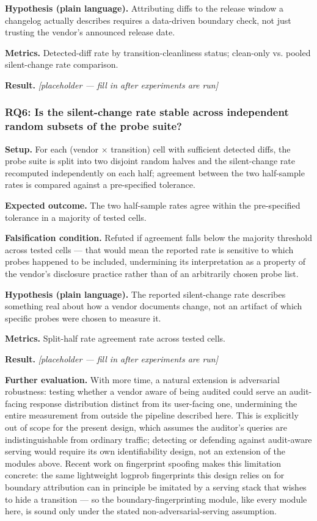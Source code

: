 \documentclass[11pt]{article}
\newcommand{\ph}{\textit{[placeholder --- fill in after experiments are run]}}
\begin{document}
\textbf{Hypothesis (plain language).} Attributing diffs to the release window a changelog actually describes requires a data-driven boundary check, not just trusting the vendor's announced release date.

\textbf{Metrics.} Detected-diff rate by transition-cleanliness status; clean-only vs. pooled silent-change rate comparison.

\textbf{Result.} \ph

\subsubsection{RQ6: Is the silent-change rate stable across independent random subsets of the probe suite?}
\textbf{Setup.} For each (vendor $\times$ transition) cell with sufficient detected diffs, the probe suite is split into two disjoint random halves and the silent-change rate recomputed independently on each half; agreement between the two half-sample rates is compared against a pre-specified tolerance.

\textbf{Expected outcome.} The two half-sample rates agree within the pre-specified tolerance in a majority of tested cells.

\textbf{Falsification condition.} Refuted if agreement falls below the majority threshold across tested cells --- that would mean the reported rate is sensitive to which probes happened to be included, undermining its interpretation as a property of the vendor's disclosure practice rather than of an arbitrarily chosen probe list.

\textbf{Hypothesis (plain language).} The reported silent-change rate describes something real about how a vendor documents change, not an artifact of which specific probes were chosen to measure it.

\textbf{Metrics.} Split-half rate agreement rate across tested cells.

\textbf{Result.} \ph

\vspace{0.5em}
\noindent\textbf{Further evaluation.} With more time, a natural extension is adversarial robustness: testing whether a vendor aware of being audited could serve an audit-facing response distribution distinct from its user-facing one, undermining the entire measurement from outside the pipeline described here. This is explicitly out of scope for the present design, which assumes the auditor's queries are indistinguishable from ordinary traffic; detecting or defending against audit-aware serving would require its own identifiability design, not an extension of the modules above. Recent work on fingerprint spoofing \citep[arXiv:2606.16100]{Zhang2026FingerprintSpoof} makes this limitation concrete: the same lightweight logprob fingerprints this design relies on for boundary attribution can in principle be imitated by a serving stack that wishes to hide a transition --- so the boundary-fingerprinting module, like every module here, is sound only under the stated non-adversarial-serving assumption.
\end{document}
